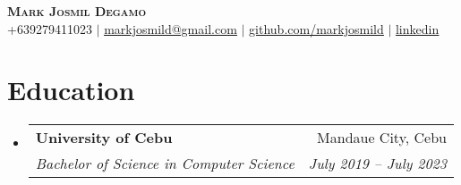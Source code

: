 \documentclass[letterpaper,11pt]{article}
\makeatletter
\newcommand{\resumeSubheading}[4]{
  \vspace{-2pt}\item
    \begin{tabular*}{0.97\textwidth}[t]{l@{\extracolsep{\fill}}r}
      \textbf{#1} & #2 \\
      \textit{\small#3} & \textit{\small #4} \\
    \end{tabular*}\vspace{-7pt}
}
\newcommand{\resumeSubHeadingListStart}{\begin{itemize}[leftmargin=0.15in, label={}]}
\newcommand{\resumeSubHeadingListEnd}{\end{itemize}}
\makeatother
\begin{document}

\begin{center}
    \textbf{\Huge \scshape Mark Josmil Degamo} \\ \vspace{1pt}
    \small +639279411023 $|$ 
    \href{mailto:markjosmild@gmail.com}
    {\underline{markjosmild@gmail.com}} $|$ 
    \href{https://www.linkedin.com/in/mark-josmil-degamo-97a05a273/}
    {\underline{github.com/markjosmild}} $|$ 
    \href{https://www.linkedin.com/in/mark-josmil-degamo-97a05a273/}
    {\underline{linkedin}}  
\end{center}

\section{Education}
  \resumeSubHeadingListStart
    \resumeSubheading
      {University of Cebu}{Mandaue City, Cebu}
      {Bachelor of Science in Computer Science}{July 2019 -- July 2023}
  \resumeSubHeadingListEnd
  

\end{document}
